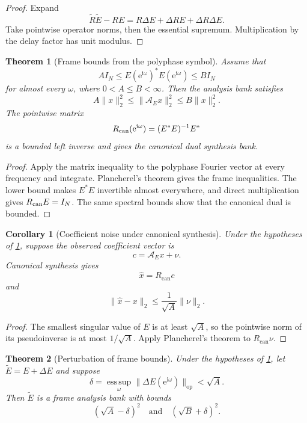 \documentclass{aomart}
\newtheorem{theorem}{Theorem}[section]
\newtheorem{corollary}[corollary]{Corollary}
\theoremstyle{definition}
\theoremstyle{remark}
\newcommand{\Acal}{\mathcal A}
\newcommand{\esssup}{\operatorname*{ess\,sup}}
\newcommand{\e}{\mathrm e}
\newcommand{\ii}{\mathrm i}
\begin{document}
\begin{proof}
Expand
\[
\widetilde R\widetilde E-RE
=
R\Delta E+\Delta R E+\Delta R\Delta E.
\]
Take pointwise operator norms, then the essential supremum. Multiplication by the delay factor has unit modulus.
\end{proof}

\begin{theorem}[Frame bounds from the polyphase symbol]\label{thm:frame_bounds}
Assume that
\[
A I_N
\leq
E(\e^{\ii\omega})^*E(\e^{\ii\omega})
\leq
B I_N
\]
for almost every \(\omega\), where \(0<A\leq B<\infty\). Then the analysis bank satisfies
\[
A\|x\|_2^2
\leq
\|\Acal_E x\|_2^2
\leq
B\|x\|_2^2.
\]
The pointwise matrix
\[
R_{\rm can}(\e^{\ii\omega})
=
(E^*E)^{-1}E^*
\]
is a bounded left inverse and gives the canonical dual synthesis bank.
\end{theorem}

\begin{proof}
Apply the matrix inequality to the polyphase Fourier vector at every frequency and integrate. Plancherel's theorem gives the frame inequalities. The lower bound makes \(E^*E\) invertible almost everywhere, and direct multiplication gives \(R_{\rm can}E=I_N\). The same spectral bounds show that the canonical dual is bounded.
\end{proof}

\begin{corollary}[Coefficient noise under canonical synthesis]\label{cor:canonical_noise}
Under the hypotheses of \cref{thm:frame_bounds}, suppose the observed coefficient vector is
\[
c=\Acal_Ex+\nu.
\]
Canonical synthesis gives
\[
\widehat x=R_{\mathrm{can}}c
\]
and
\[
\|\widehat x-x\|_2
\leq
\frac1{\sqrt A}\|\nu\|_2.
\]
\end{corollary}

\begin{proof}
The smallest singular value of \(E\) is at least \(\sqrt A\), so the pointwise norm of its pseudoinverse is at most \(1/\sqrt A\). Apply Plancherel's theorem to \(R_{\mathrm{can}}\nu\).
\end{proof}

\begin{theorem}[Perturbation of frame bounds]\label{thm:frame_perturbation}
Under the hypotheses of \cref{thm:frame_bounds}, let \(\widetilde E=E+\Delta E\) and suppose
\[
\delta=\esssup_\omega\|\Delta E(\e^{\ii\omega})\|_{\mathrm{op}}<\sqrt A.
\]
Then \(\widetilde E\) is a frame analysis bank with bounds
\[
(\sqrt A-\delta)^2
\quad\text{and}\quad
(\sqrt B+\delta)^2.
\]
\end{theorem}
\end{document}
